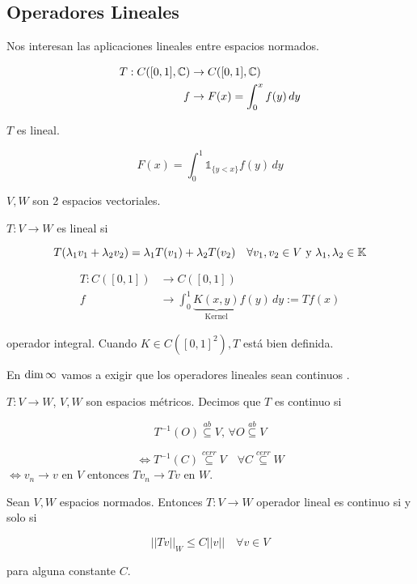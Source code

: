 \subsection{Operadores Lineales}

Nos interesan las aplicaciones lineales entre espacios normados.

\begin{fexample}
    \begin{align*}T:C([0,1],\mathbb{C})&\to C([0,1],\mathbb{C})\\
    f&\to F(x)=\int_0^x f(y)\, dy\end{align*}

    $T$ es lineal.

    \[F(x)=\int_0^1 \mathds{1}_{\{y<x\}} f(y)\,dy\]
\end{fexample}

\begin{fdefinition}
    $V,W$ son 2 espacios vectoriales.

    $T:V\to W$ es lineal si 

    \[T(\lambda_1 v_1+\lambda_2 v_2)=\lambda_1 T(v_1)+\lambda_2 T(v_2)\quad \forall v_1,v_2\in V\text{ y } \lambda_1,\lambda_2\in \mathbb{K}\]

\end{fdefinition}

\begin{align*}T:C([0,1])&\to C([0,1])\\
f&\to \int_0^1 \underbrace{K(x,y)}_{\text{Kernel}} f(y)\,dy:=Tf(x)\end{align*}

operador integral. Cuando $K\in C([0,1]^2), T$ está bien definida.

En $\operatorname{dim} \infty$ vamos a exigir que los operadores lineales sean \color{red} continuos \color{black}.

\begin{fdefinition}
    $T:V\to W$, $V,W$ son espacios métricos. Decimos que $T$ es continuo si
    
    \[T^{-1}(O)\overset{ab}{\subseteq} V,\, \forall O\overset{ab}{\subseteq} V\]

    \[\iff T^{-1}(C)\overset{cerr}{\subseteq} V\quad \forall C\overset{cerr}{\subseteq} W\]
    $\iff v_n\to v$ en $V$ entonces $Tv_n\to Tv$ en $W$.
\end{fdefinition}

\begin{ftheorem}
    Sean $V,W$ espacios normados. Entonces $T:V\to W$ operador lineal es continuo si y solo si

    \begin{equation}||Tv||_W\leq C||v||\quad \forall v\in V\end{equation}

    para alguna constante $C$.
\end{ftheorem}

